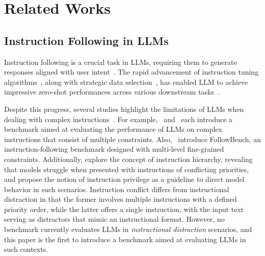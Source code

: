 \section{Related Works}
\subsection{Instruction Following in LLMs}

Instruction following is a crucial task in LLMs, requiring them to generate responses aligned with user intent~\cite{zhou2023instruction}. 
The rapid advancement of instruction tuning algorithms~\cite{wang2022self, ouyang2022training,xu2023wizardlm}, along with strategic data selection~\cite{wang2024survey}, has enabled LLM to achieve impressive zero-shot performances across various downstream tasks~\cite{peng2023instruction, wang2023aligning}.

Despite this progress, several studies highlight the limitations of LLMs when dealing with complex instructions~\cite{xu2023wizardlm,zhou2023instruction,he2024complex}. 
For example,~\citet{wen2024benchmarking} and~\citet{he2024can} each introduce a benchmark aimed at evaluating the performance of LLMs on complex instructions that consist of multiple constraints. 
Also,~\citet{jiang2023followbench} introduce FollowBench, an instruction-following benchmark designed with multi-level fine-grained constraints. 
Additionally, \citet{wallace2024instruction} explore the concept of instruction hierarchy, revealing that models struggle when presented with instructions of conflicting priorities, and propose the notion of instruction privilege as a guideline to direct model behavior in such scenarios.
Instruction conflict differs from instructional distraction in that the former involves multiple instructions with a defined priority order, while the latter offers a single instruction, with the input text serving as distractors that mimic an instructional format. However, no benchmark currently evaluates LLMs in \textit{instructional distraction} scenarios, and this paper is the first to introduce a benchmark aimed at evaluating LLMs in such contexts.

